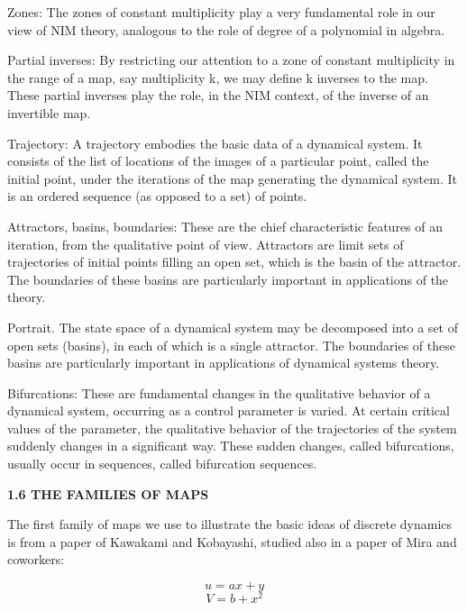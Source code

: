 \documentclass[12pt]{article}
\begin{document}
\hfill

Zones: The zones of constant multiplicity play a very fundamental
role in our view of NIM theory, analogous to the role of
degree of a polynomial in algebra.

\hfill

Partial inverses: By restricting our attention to a zone of constant
multiplicity in the range of a map, say multiplicity k, we may
define k inverses to the map. These partial inverses play the role, in
the NIM context, of the inverse of an invertible map.

\hfill

Trajectory: A trajectory embodies the basic data of a dynamical
system. It consists of the list of locations of the images of a particular
point, called the initial point, under the iterations of the map
generating the dynamical system. It is an ordered sequence (as
opposed to a set) of points.

\hfill

Attractors, basins, boundaries: These are the chief characteristic
features of an iteration, from the qualitative point of view.
Attractors are limit sets of trajectories of initial points filling an
open set, which is the basin of the attractor. The boundaries of these
basins are particularly important in applications of the theory.

\hfill

Portrait. The state space of a dynamical system may be decomposed
into a set of open sets (basins), in each of which is a single
attractor. The boundaries of these basins are particularly important
in applications of dynamical systems theory.

\hfill

Bifurcations: These are fundamental changes in the qualitative
behavior of a dynamical system, occurring as a control parameter is
varied. At certain critical values of the parameter, the qualitative
behavior of the trajectories of the system suddenly changes in a significant
way. These sudden changes, called bifurcations, usually
occur in sequences, called bifurcation sequences.

\hfill

\textbf{1.6 THE FAMILIES OF MAPS}

\hfill

The first family of maps we use to illustrate the basic ideas of
discrete dynamics is from a paper of Kawakami and Kobayashi,
studied also in a paper of Mira and coworkers:

\[
u = ax+ y
\]
\[
V = b+x^2
\]
\end{document}
